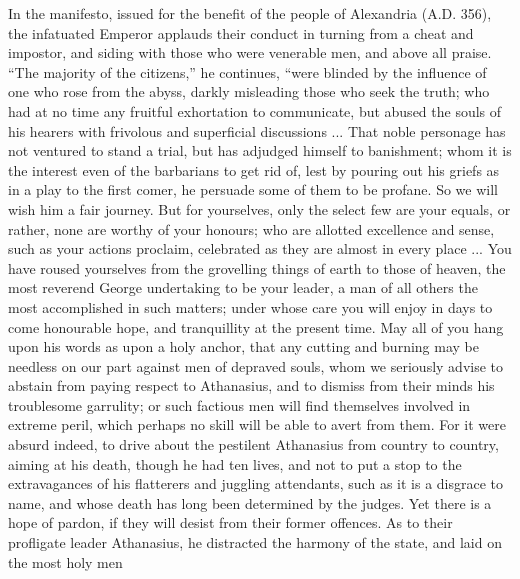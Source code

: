 In the manifesto, issued for the benefit of the people of
Alexandria (A.D. 356), the infatuated Emperor
applauds their conduct in turning from a cheat and impostor, and
siding with those who were venerable men, and above all praise.
``The majority of the citizens,'' he continues, ``were
blinded by the influence of one who rose from the abyss, darkly
misleading those who seek the truth; who had at no time any fruitful
exhortation to communicate, but abused the souls of his hearers with
frivolous and superficial discussions ... That noble personage has not
ventured to stand a trial, but has adjudged himself to banishment;
whom it is the interest even of the barbarians to get rid of, lest by
pouring out his griefs as in a play to the first comer, he persuade
some of them to be profane. So we will wish him a fair journey. But
for yourselves, only the select few are your equals, or rather, none
are worthy of your honours; who are allotted excellence and sense,
such as your actions proclaim, celebrated as they are almost in every
place ... You have roused yourselves from the grovelling things of
earth to those of heaven, the most reverend George undertaking to be
your leader, a man of all others the most accomplished in such
matters; under whose care you will enjoy in days to come honourable
hope, and tranquillity at the present time. May all of you hang upon
his words as upon a holy anchor, that any cutting and burning may be
needless on our part against men of depraved souls, whom we seriously
advise to abstain from paying respect to Athanasius, and to dismiss
from their minds his troublesome garrulity; or such factious men will
find themselves involved in extreme peril, which perhaps no skill will
be able to avert from them. For it were absurd indeed, to drive
about the pestilent Athanasius from country to country, aiming at his
death, though he had ten lives, and not to put a stop to the
extravagances of his flatterers and juggling attendants, such as it is
a disgrace to name, and whose death has long been determined by the
judges. Yet there is a hope of pardon, if they will desist from their
former offences. As to their profligate leader Athanasius, he
distracted the harmony of the state, and laid on the most holy men
